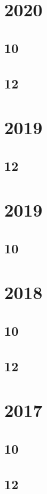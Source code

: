 \documentclass[11pt]{book}
\begin{document}
\section{2020}
\subsection{10}

\subsection{12}

\section{2019}
\subsection{12}





\section{2019}
\subsection{10}

\section{2018}
\subsection{10}


\subsection{12}




\section{2017}
\subsection{10}

\subsection{12}

\end{document}
